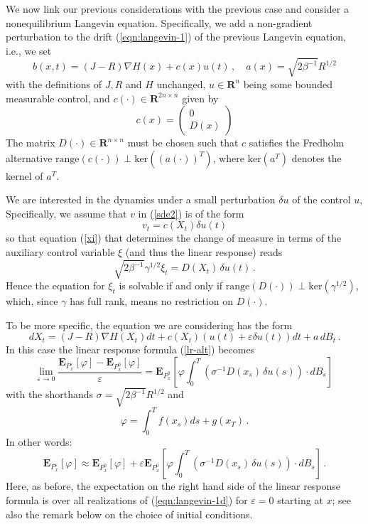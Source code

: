 \documentclass[]{tMPH2e}
\newcommand{\R}{{\mathbf R}}
\newcommand{\eps}{\varepsilon}
\newcommand{\bE}{{\mathbf E}}
\begin{document}
We now link our previous considerations with the previous case and consider a nonequilibrium Langevin equation. Specifically, we add a non-gradient perturbation to the drift (\ref{eqn:langevin-1}) of the previous Langevin equation, i.e., we set 
\begin{equation}\label{eqn:langevin-1b}
b(x,t) = (J-R)\nabla H(x) +  c(x) u(t)\,,\quad a(x) = \sqrt{2\beta^{-1}}R^{1/2}
\end{equation}
with the definitions of $J,R$ and $H$ unchanged, $u\in\R^{n}$ being some bounded measurable control, and $c(\cdot)\in\R^{2n\times n}$ given by 
\[
c(x) = \left( \begin{array}{c}
0 \\ D(x) \end{array}\right)
\]
The matrix $D(\cdot)\in\R^{n\times n}$ must be chosen such that $c$ satisfies the Fredholm alternative $\mathrm{range}(c(\cdot))\perp \mathrm{ker}((a(\cdot))^{T})$, where $\mathrm{ker}(a^T)$ denotes the kernel of $a^T$. 

We are interested in the dynamics under a small perturbation $\delta u$ of the control $u$, Specifically, we assume that $v$ in (\ref{sde2}) is of the form 
\begin{equation}\label{eqn:langevin-1c}
v_{t} = c(X_{t})\delta u(t)
\end{equation}
so that equation (\ref{xi}) that determines the change of measure in terms of the auxiliary control variable $\xi$ (and thus the linear response) reads 
\[
\sqrt{2\beta^{-1}}{\gamma}^{1/2} \xi_{t} = D(X_{t})\,\delta u(t)\,.
\]
Hence the equation for $\xi_{t}$ is solvable if and only if $\mathrm{range}(D(\cdot))\perp \mathrm{ker}(\gamma^{1/2})$, which, since $\gamma$ has full rank, means no restriction on $D(\cdot)$.

To be more specific, the equation we are considering has the form
\begin{equation}\label{eqn:langevin-1d}
dX_t =  (J-R)\nabla H(X_{t})dt + c(X_t)(u(t)+\eps \delta u(t))dt+a\, dB_t\,.
\end{equation}
In this case the linear response formula (\ref{lr-alt})  becomes
\begin{equation}\label{lr-alt2}
\lim_{\eps\to 0}\frac{\bE_{P_{x}^{\eps}}[\varphi] - \bE_{P_{x}^{0}}[\varphi]}{\eps} =  \bE_{P_{x}^{0}}\left[\varphi\int_{0}^{T}(\sigma^{-1}D(x_{s})\,\delta u(s))\cdot dB_{s} \right]\,
\end{equation}
with the shorthands $\sigma=\sqrt{2\beta^{-1}}R^{1/2}$ and 
\[
\varphi = \int_{0}^{T}f(x_{s})ds+g(x_{T})\,.
\]
In other words: 
\begin{equation}\label{eqn:neq-response}
\bE_{P_{x}^{\eps}}[\varphi] \approx \bE_{P_{x}^0}[\varphi] + \eps\bE_{P_{x}^0}\left[\varphi\int_{0}^{T}(\sigma^{-1}D(x_{s})\,\delta u(s))\cdot dB_{s} \right]\,.
\end{equation}
Here, as before, the expectation on the right hand side of the linear response formula is over all realizations of (\ref{eqn:langevin-1d}) for $\eps=0$ starting at $x$; see also the remark below on the choice of initial conditions. 
\end{document}
